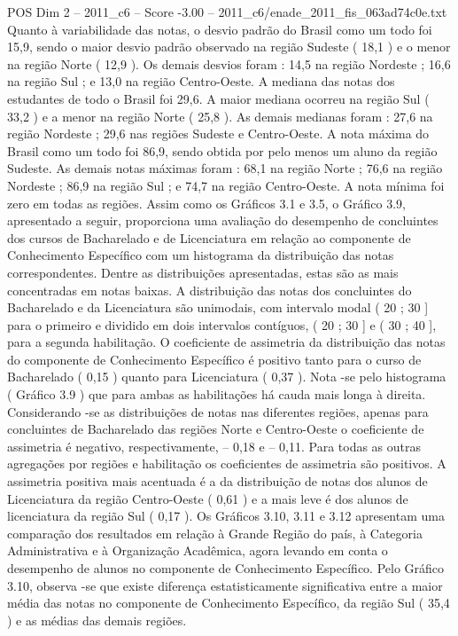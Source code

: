 \begin{textsample}{POS Dim 2 – 2011\_c6 – Score -3.00 – 2011\_c6/enade\_2011\_fis\_063ad74c0e.txt}
Quanto à variabilidade das notas, o desvio padrão do Brasil como um todo foi 15,9, sendo o maior desvio padrão observado na região Sudeste ( 18,1 ) e o menor na região Norte ( 12,9 ).
Os demais desvios foram : 14,5 na região Nordeste ; 16,6 na região Sul ; e 13,0 na região Centro-Oeste.
A mediana das notas dos estudantes de todo o Brasil foi 29,6.
A maior mediana ocorreu na região Sul ( 33,2 ) e a menor na região Norte ( 25,8 ).
As demais medianas foram : 27,6 na região Nordeste ; 29,6 nas regiões Sudeste e Centro-Oeste.
A nota máxima do Brasil como um todo foi 86,9, sendo obtida por pelo menos um aluno da região Sudeste.
As demais notas máximas foram : 68,1 na região Norte ; 76,6 na região Nordeste ; 86,9 na região Sul ; e 74,7 na região Centro-Oeste.
A nota mínima foi zero em todas as regiões.
Assim como os Gráficos 3.1 e 3.5, o Gráfico 3.9, apresentado a seguir, proporciona uma avaliação do desempenho de concluintes dos cursos de Bacharelado e de Licenciatura em relação ao componente de Conhecimento Específico com um histograma da distribuição das notas correspondentes.
Dentre as distribuições apresentadas, estas são as mais concentradas em notas baixas.
A distribuição das notas dos concluintes do Bacharelado e da Licenciatura são unimodais, com intervalo modal ( 20 ; 30 ] para o primeiro e dividido em dois intervalos contíguos, ( 20 ; 30 ] e ( 30 ; 40 ], para a segunda habilitação.
O coeficiente de assimetria da distribuição das notas do componente de Conhecimento Específico é positivo tanto para o curso de Bacharelado ( 0,15 ) quanto para Licenciatura ( 0,37 ).
Nota -se pelo histograma ( Gráfico 3.9 ) que para ambas as habilitações há cauda mais longa à direita.
Considerando -se as distribuições de notas nas diferentes regiões, apenas para concluintes de Bacharelado das regiões Norte e Centro-Oeste o coeficiente de assimetria é negativo, respectivamente, – 0,18 e – 0,11.
Para todas as outras agregações por regiões e habilitação os coeficientes de assimetria são positivos.
A assimetria positiva mais acentuada é a da distribuição de notas dos alunos de Licenciatura da região Centro-Oeste ( 0,61 ) e a mais leve é dos alunos de licenciatura da região Sul ( 0,17 ).
Os Gráficos 3.10, 3.11 e 3.12 apresentam uma comparação dos resultados em relação à Grande Região do país, à Categoria Administrativa e à Organização Acadêmica, agora levando em conta o desempenho de alunos no componente de Conhecimento Específico.
Pelo Gráfico 3.10, observa -se que existe diferença estatisticamente significativa entre a maior média das notas no componente de Conhecimento Específico, da região Sul ( 35,4 ) e as médias das demais regiões.

\end{textsample}

